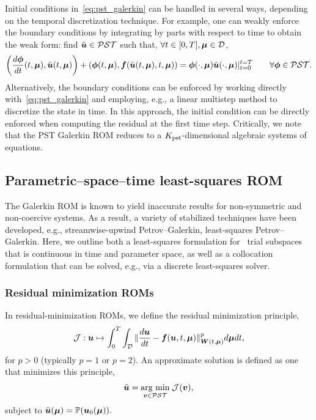 \documentclass[3p,computermodern,10pt]{elsarticle}
\begin{document}
Initial conditions in~\eqref{eq:pst_galerkin} can be handled in several ways, depending on the temporal discretization technique. For example, one can weakly enforce the boundary conditions by integrating by parts with respect to time to obtain the weak form: find $\tilde{\boldsymbol u} \in \mathcal{PST}$ such that, $\forall t \in [0,T], \boldsymbol \mu \in \mathcal{D}$,
$$\left( \frac{d\boldsymbol \phi}{dt}(t,\boldsymbol \mu) ,\tilde{\boldsymbol u}(t,\boldsymbol \mu) \right) + \left(\boldsymbol \phi(t,\boldsymbol \mu),  \boldsymbol f(\tilde{\boldsymbol u}(t,\boldsymbol \mu),t,\boldsymbol \mu) \right)  = \boldsymbol \phi(\cdot,\boldsymbol \mu) \tilde{\boldsymbol u}(\cdot,\boldsymbol \mu) |_{t=0}^{t=T}\qquad \forall \boldsymbol \phi \in  \mathcal{PST}.$$
Alternatively, the boundary conditions can be enforced by working directly with~\eqref{eq:pst_galerkin} and employing, e.g., a linear multistep method to discretize the state in time. In this approach, the initial condition can be directly enforced when computing the residual at the first time step. Critically, we note that the PST Galerkin ROM reduces to a $K_{\text{pst}}$-dimensional algebraic systems of equations.  

\subsection{Parametric--space--time least-squares ROM}
The Galerkin ROM is known to yield inaccurate results for non-symmetric and non-coercive systems. As a result, a variety of stabilized techniques have been developed, e.g., streamwise-upwind Petrov--Galerkin, least-squares Petrov--Galerkin. Here, we outline both a least-squares formulation for \parametricSpaceTimeAcronym\ trial subspaces that is continuous in time and parameter space, as well as a collocation formulation that can be solved, e.g., via a discrete least-squares solver. 

\subsubsection{Residual minimization ROMs}
In residual-minimization ROMs, we define the residual minimization principle,
\begin{equation}\label{eq:minimization_principle}
\mathcal{J} : \boldsymbol u \mapsto \int_{0}^T \int_{\mathcal{D}} \| \frac{d \boldsymbol u}{dt} - \boldsymbol f(\boldsymbol u,t,\boldsymbol \mu) \|_{\boldsymbol W(t,\boldsymbol \mu)}^p d\boldsymbol \mu dt,
\end{equation}
for $p>0$ (typically $p=1$ or $p=2$).
An approximate solution is defined as one that minimizes this principle, 
\begin{equation}\label{eq:minimization_problem}
\tilde{\boldsymbol u} = \underset{ \boldsymbol v \in \mathcal{PST}}{\text{arg min}}\;\mathcal{J}(\boldsymbol v),
\end{equation}
subject to $\tilde{\boldsymbol u}(\boldsymbol \mu) = \mathbb{P}(\boldsymbol u_0(\boldsymbol \mu)).$ 
\end{document}
